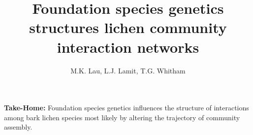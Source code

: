 \documentclass[11pt]{amsart}
\title{Foundation species genetics structures lichen community
  interaction networks}
\author{M.K. Lau, L.J. Lamit, T.G. Whitham}
\begin{document}
\maketitle


\setcounter{tocdepth}{1}
\tableofcontents




























\textbf{Take-Home:} Foundation species genetics influences the structure of
  interactions among bark lichen species most likely by altering the
  trajectory of community assembly.
\end{document}

